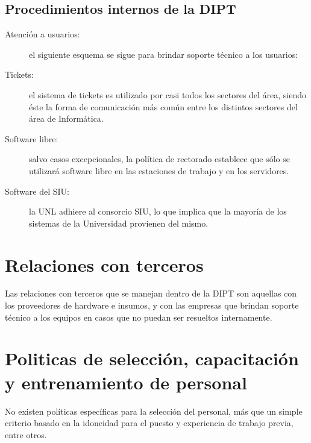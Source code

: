 \documentclass[a4paper,11pt,oneside]{article}
\begin{document}
\subsection*{Procedimientos internos de la DIPT}
%
\begin{description}
\item[Atención a usuarios:] el siguiente esquema se sigue para brindar
  soporte técnico a los usuarios:
\item[Tickets:] el sistema de tickets es utilizado por casi todos los
  sectores del área, siendo éste la forma de comunicación más
  común entre los distintos sectores del área de Informática.
\item[Software libre:] salvo casos excepcionales, la política de
  rectorado establece que sólo se utilizará software libre en las
  estaciones de trabajo y en los servidores.
\item[Software del SIU:] la UNL adhiere al consorcio SIU, lo que
  implica que la mayoría de los sistemas de la Universidad provienen
  del mismo.
\end{description}
%
\section{Relaciones con terceros}
Las relaciones con terceros que se manejan dentro de la DIPT son
aquellas con los proveedores de hardware e insumos, y con las empresas
que brindan soporte técnico a los equipos en casos que no puedan ser
resueltos internamente.
%
\section{Politicas de selección, capacitación y entrenamiento de personal}
%
No existen políticas específicas para la selección del personal, más
que un simple criterio basado en la idoneidad para el puesto y
experiencia de trabajo previa, entre otros.
\end{document}
